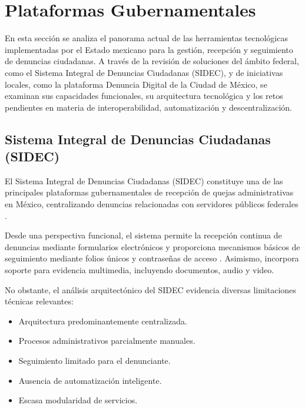 
\section{Plataformas Gubernamentales}

En esta sección se analiza el panorama actual de las herramientas tecnológicas implementadas por el Estado mexicano para la gestión, recepción y seguimiento de denuncias ciudadanas. A través de la revisión de soluciones del ámbito federal, como el Sistema Integral de Denuncias Ciudadanas (SIDEC), y de iniciativas locales, como la plataforma Denuncia Digital de la Ciudad de México, se examinan sus capacidades funcionales, su arquitectura tecnológica y los retos pendientes en materia de interoperabilidad, automatización y descentralización.

\subsection{Sistema Integral de Denuncias Ciudadanas (SIDEC)}

\begin{flushleft}
\justifying

El Sistema Integral de Denuncias Ciudadanas (SIDEC) constituye una de las principales plataformas gubernamentales de recepción de quejas administrativas en México, centralizando denuncias relacionadas con servidores públicos federales \cite{6}.

Desde una perspectiva funcional, el sistema permite la recepción continua de denuncias mediante formularios electrónicos y proporciona mecanismos básicos de seguimiento mediante folios únicos y contraseñas de acceso \cite{7}. Asimismo, incorpora soporte para evidencia multimedia, incluyendo documentos, audio y video.

No obstante, el análisis arquitectónico del SIDEC evidencia diversas limitaciones técnicas relevantes:

\begin{itemize}

    \item Arquitectura predominantemente centralizada.
    
    \item Procesos administrativos parcialmente manuales.
    
    \item Seguimiento limitado para el denunciante.
    
    \item Ausencia de automatización inteligente.
    
    \item Escasa modularidad de servicios.

\end{itemize}

\end{flushleft}

